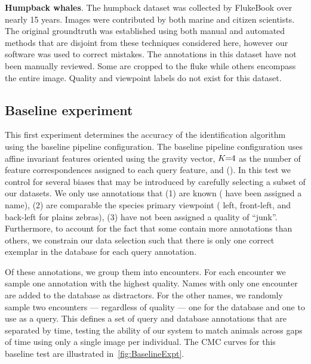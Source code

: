 \begin{itemln}
            \item \textbf{Humpback whales}.
            The humpback dataset was collected by FlukeBook over nearly 15 years.
            Images were contributed by both marine and citizen scientists.
            The original groundtruth was established using both manual and automated methods that are disjoint
              from these techniques considered here, however our software was used to correct mistakes.
            The annotations in this dataset have not been manually reviewed.
            Some are cropped to the fluke while others encompass the entire image.
            Quality and viewpoint labels do not exist for this dataset.
        \end{itemln}

    \FloatBarrier{}
    \subsection{Baseline experiment}\label{sub:exptbase}

        This first experiment determines the accuracy of the identification algorithm using the baseline pipeline
          configuration.
        The baseline pipeline configuration uses affine invariant features oriented using the gravity vector,
          $K\mkern-6mu=\mkern-6mu4$ as the number of feature correspondences assigned to each query feature, and \nscoring{}
          (\nsum{}).
        In this test we control for several biases that may be introduced by carefully selecting a subset of our
          datasets.
        We only use annotations that
        (1) are known (\ie{} have been assigned a name),
        (2) are comparable the species primary viewpoint (\eg{} left, front-left, and back-left for plains
          zebras),
        (3) have not been assigned a quality of ``junk''.
        Furthermore, to account for the fact that some \names{} contain more annotations than others, we
          constrain our data selection such that there is only one correct exemplar in the database for each query
          annotation.

        Of these annotations, we group them into encounters.
        For each encounter we sample one annotation with the highest quality.
        Names with only one encounter are added to the database as distractors.
        For the other names, we randomly sample two encounters --- regardless of quality --- one for the database
          and one to use as a query.
        This defines a set of query and database annotations that are separated by time, testing the ability of
          our system to match animals across gaps of time using only a single image per individual.
        The CMC curves for this baseline test are illustrated in~\cref{fig:BaselineExpt}.

